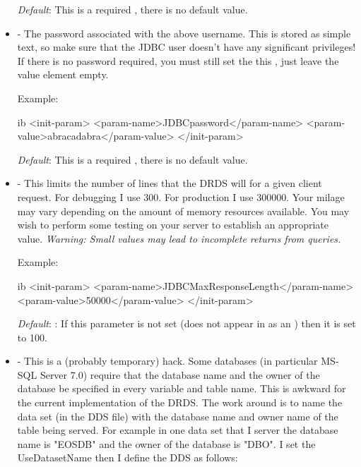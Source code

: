 \documentclass{dods-book}
\begin{document}
\begin{itemize}
\emph{Default}: This is a required , there is no default value. 



\item {} - The password associated with the above username. This is 
stored as simple text, so make sure that the JDBC user doesn't have any significant 
privileges! If there is no password required, you must still set the this , 
just leave the value element empty.

Example:

\begin{vcode}{ib}
    <init-param>
        <param-name>JDBCpassword</param-name>
        <param-value>abracadabra</param-value>
    </init-param>
\end{vcode}
          
\emph{Default}: This is a required , there is no default value. 



\item {} - This limits the number of lines that the DRDS will for a 
given client request. For debugging I use 300. For production I use 300000. Your
 milage may vary depending on the amount of memory resources available. You may 
 wish to perform some testing on your server to establish an appropriate value. 
 \emph{Warning: Small values may lead to incomplete returns from queries.}

Example:

\begin{vcode}{ib}
    <init-param>
        <param-name>JDBCMaxResponseLength</param-name>
        <param-value>50000</param-value>
    </init-param>
\end{vcode}
          
\emph{Default}: : If this parameter is not set (does not appear in as an  ) 
then it is set to 100.

 

\item {} - This is a (probably temporary) hack. Some databases (in particular 
MS-SQL Server 7.0) require that the database name and the owner of the database be 
specified in every variable and table name. This is awkward for the current implementation 
of the DRDS. The work around is to name the data set (in the DDS file) with the database 
name and owner name of the table being served. For example in one data set that I server 
the database name is "EOSDB" and the owner of the database is "DBO". I set the  
UseDatasetName then I define the DDS as follows:


\end{itemize}
\end{document}
